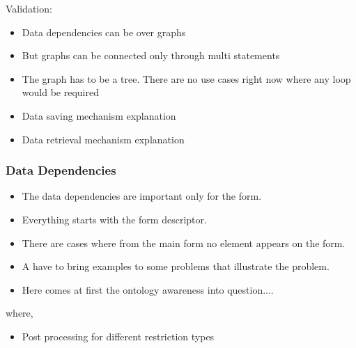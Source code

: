 
Validation:

\begin{itemize}
	\item Data dependencies can be over graphs
	\item But graphs can be connected only through multi statements
	\item The graph has to be a tree. There are no use cases right now where any loop would be required
\end{itemize}


\begin{itemize}
	\item Data saving mechanism explanation
	\item Data retrieval mechanism explanation
\end{itemize}

\subsubsection{Data Dependencies}


\begin{itemize}
	\item The data dependencies are important only for the form. 
	\item Everything starts with the form descriptor.
	\item There are cases where from the main form no element appears on the form.
	\item A have to bring examples to some problems that illustrate the problem.
	\item Here comes at first the ontology awareness into question....
\end{itemize}



where,



\begin{itemize}
	\item Post processing for different restriction types
\end{itemize}



